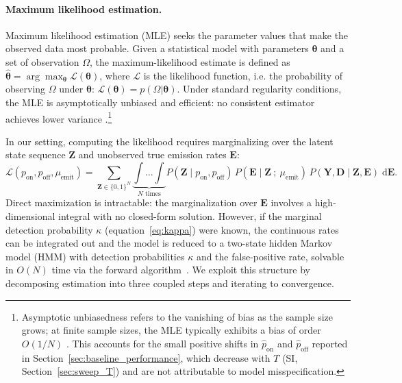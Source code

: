 \documentclass[unnumsec,webpdf,modern,mediumone]{oup-authoring-template}
\newcommand{\new}[1]{{\color{blue}#1}}
\begin{document}
\paragraph{Maximum likelihood estimation.}
Maximum likelihood estimation (MLE) seeks the parameter values that make the observed data most probable. Given a statistical model with parameters $\boldsymbol{\theta}$ and a set of observation $\Omega$, the maximum-likelihood estimate is defined as $\hat{\boldsymbol{\theta}} = \arg\max_{\boldsymbol{\theta}} \mathcal{L}(\boldsymbol{\theta})$, where $\mathcal{L}$ is the likelihood function, i.e. the probability of observing $\Omega$ under $\boldsymbol{\theta}$: $\mathcal{L}(\boldsymbol{\theta})=p(\Omega|\boldsymbol{\theta})$. Under standard regularity conditions, the MLE is asymptotically unbiased and efficient: no consistent estimator achieves lower variance \citep{vanderVaart1998}.\new{\footnote{Asymptotic unbiasedness refers to the vanishing of bias as the sample size grows; at finite sample sizes, the MLE typically exhibits a bias of order $O(1/N)$ \citep[Ch.~5]{vanderVaart1998}. This accounts for the small positive shifts in $\hat p_{\text{on}}$ and $\hat p_{\text{off}}$ reported in Section~\ref{sec:baseline_performance}, which decrease with $T$ (SI, Section~\ref{sec:sweep_T}) and are not attributable to model misspecification.}} %

In our setting, computing the likelihood requires marginalizing over the latent state sequence $\mathbf{Z}$ and unobserved true emission rates $\mathbf{E}$:
\begin{equation}
    \mathcal{L}(p_\text{on}, p_\text{off},\mu_\text{emit})
    = \sum_{\mathbf{Z}\in\{0,1\}^N} 
    \underbrace{\int\ldots\int}_{N\text{ times}}
      P(\mathbf{Z}\mid p_\text{on}, p_\text{off}) \,
      P(\mathbf{E} \mid \mathbf{Z}~;~\mu_\text{emit}) \,
      P(\mathbf{Y}, \mathbf{D} \mid \mathbf{Z}, \mathbf{E})
      \; \mathrm{d}\mathbf{E}.
    \label{eq:full_likelihood}
\end{equation}
Direct maximization is intractable: the marginalization over $\mathbf{E}$ involves a high-dimensional integral with no closed-form solution. However, if the marginal detection probability $\kappa$ (equation~\ref{eq:kappa}) were known, the continuous rates can be integrated out and the model is reduced to a two-state hidden Markov model (HMM) with detection probabilities $\kappa$ and the false-positive rate, solvable in $O(N)$ time via the forward algorithm~\citep{jurafsky2014speech}. We exploit this structure by decomposing estimation into three coupled steps and iterating to convergence.
\end{document}
